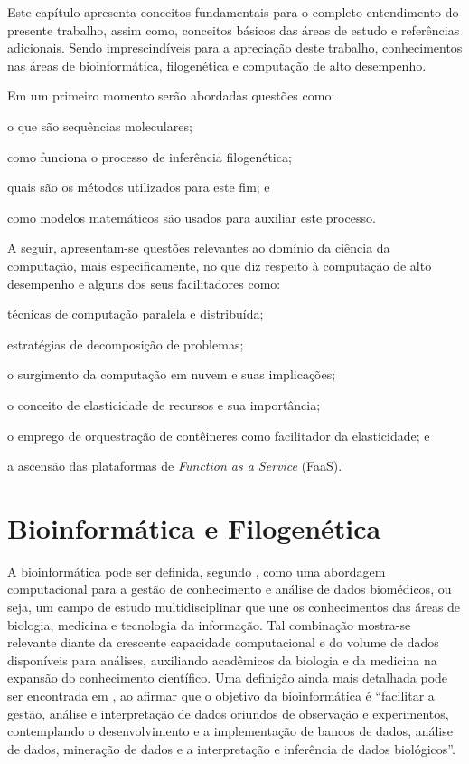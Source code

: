 \documentclass[english,brazilian]{UNISINOSmonografia} %
\begin{document}


Este capítulo apresenta conceitos fundamentais para o completo entendimento do presente trabalho, assim como, conceitos básicos das áreas de estudo e referências adicionais.
Sendo imprescindíveis para a apreciação deste trabalho, conhecimentos nas áreas de bioinformática, filogenética e computação de alto desempenho.



Em um primeiro momento serão abordadas questões como:
\begin{inparaenum} 
	\item o que são sequências moleculares;
	\item como funciona o processo de inferência filogenética;
	\item quais são os métodos utilizados para este fim; e
	\item como modelos matemáticos são usados para auxiliar este processo.
\end{inparaenum}
A seguir, apresentam-se questões relevantes ao domínio da ciência da computação, mais especificamente, no que diz respeito à computação de alto desempenho e alguns dos seus facilitadores como:
\begin{inparaenum} 
	\item técnicas de computação paralela e distribuída;
	\item estratégias de decomposição de problemas;
	\item o surgimento da computação em nuvem e suas implicações;
	\item o conceito de elasticidade de recursos e sua importância;
	\item o emprego de orquestração de contêineres como facilitador da elasticidade; e
	\item a ascensão das plataformas de \textit{Function as a Service} (FaaS).
\end{inparaenum}


\section{Bioinformática e Filogenética}
\label{sec:bioinformatica}


A bioinformática pode ser definida, segundo , como uma abordagem computacional para a gestão de conhecimento e análise de dados biomédicos, ou seja, um campo de estudo multidisciplinar que une os conhecimentos das áreas de biologia, medicina e tecnologia da informação.
Tal combinação mostra-se relevante diante da crescente capacidade computacional e do volume de dados disponíveis para análises, auxiliando acadêmicos da biologia e da medicina na expansão do conhecimento científico.
Uma definição ainda mais detalhada pode ser encontrada em , ao afirmar que o objetivo da bioinformática é ``facilitar a gestão, análise e interpretação de dados oriundos de observação e experimentos, contemplando o desenvolvimento e a implementação de bancos de dados, análise de dados, mineração de dados e a interpretação e inferência de dados biológicos''.
\end{document}
